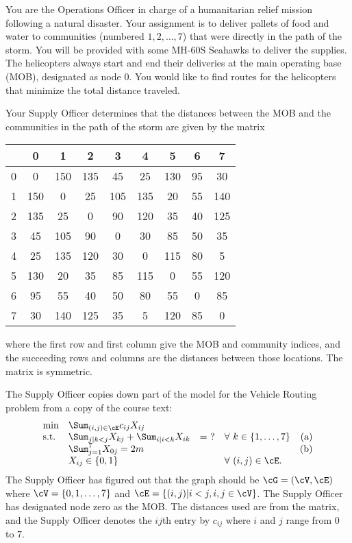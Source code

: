 \documentclass[10pt]{article}
\begin{document}

You are the Operations Officer in charge of a humanitarian relief mission following a natural disaster.  Your assignment is to deliver pallets of food and water to communities (numbered $1,2,\dots, 7$) that were directly in the path of the storm.  You will be provided with some MH-60S Seahawks to deliver the supplies.   The helicopters always start and end their deliveries at the main operating base (MOB), designated as node 0.  You would like to find routes for the helicopters that minimize the total distance traveled. 

Your Supply Officer determines that the distances between the MOB and the communities in the path of the storm are given by the matrix 

\begin{center}
\begin{tabular}{l|cccccccc}
 & 0 & 1 & 2 & 3 & 4 & 5 & 6 & 7\\
\hline
0 & 0	&	150	&	135	&	45	&	25	&	130  & 95 & 30 \\
1 & 150	&	0	&	25	&	105	&	135	&	20 & 55 & 140 \\
2 & 135 & 25	&	0	&	90	&	120	&	35	& 40 & 125 \\
3& 45	&	105	&	90	&	0	&	30	&	85	& 50 & 35 \\
4& 25	&	135	&	120	&	30	&	0	&	115	& 80 & 5 \\
5& 130	&	20	&	35	&	85	&	115	&	0	& 55 & 120 \\
6& 95	&	55	&	40	&	50	&	80	&	55	& 0 & 85\\
7& 30	&	140	&	125	&	35	&	5	&	120	& 85 & 0\\
\end{tabular}
\end{center}

\noindent where the first row and first column give the MOB and community indices, and the succeeding rows and columns are the distances between those locations.  The matrix is symmetric.

The Supply Officer copies down part of the model for the Vehicle Routing problem from a copy of the course text:
\[
\begin{array}{llllr}
  \min & \Sum_{(i,j) \in \cE} c_{ij} X_{ij} & \\
\mbox{s.t.} & \Sum_{j | k < j} X_{kj} + \Sum_{i|i<k} X_{ik} & = \ ? & \forall~ k \in \{
1,\ldots,7\} & (\rm{a}) \\
&  \Sum_{j=1}^{7} X_{0j}  = 2m & & & (\rm{b}) \\
& X_{ij} \in \{0,1\} & & \forall~ (i,j) \in \cE. &
\end{array}
\]
The Supply Officer has figured out that the graph should be $\cG = (\cV,\cE)$ where $\cV
= \{0,1,\ldots,7\}$ and $\cE = \{ (i,j) | i < j, i,j \in \cV\}$. The Supply Officer
has designated node zero as the MOB. The distances used are from the matrix, and the Supply Officer denotes the $ij$th entry by $c_{ij}$ where $i$ and $j$ range from $0$ to $7$.
\end{document}
